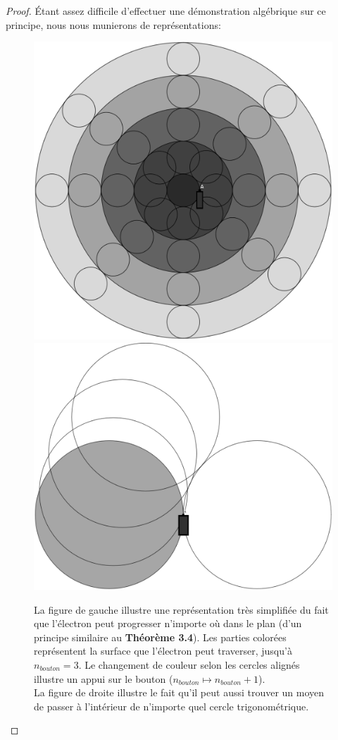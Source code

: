 \documentclass[a4paper]{amsart}
\theoremstyle{definition}
\theoremstyle{remark}
\numberwithin{equation}{section}
\begin{document}
\begin{proof}

  Étant assez difficile d'effectuer une démonstration algébrique sur ce principe, nous nous munierons de représentations:

  \begin{figure}[H]
    \centering
    \includegraphics[scale=0.13]{images/it_can.png}
    \includegraphics[scale=0.12]{images/it_can2.png}
    \caption{La figure de gauche illustre une représentation très simplifiée du fait que l'électron peut progresser n'importe où dans le plan (d'un principe similaire au \textbf{Théorème 3.4}). Les parties colorées représentent la surface que l'électron peut traverser, jusqu'à $n_{bouton}=3$. Le changement de couleur selon les cercles alignés
    illustre un appui sur le bouton ($n_{bouton} \longmapsto n_{bouton}+1$). \\ La figure de droite illustre le fait qu'il peut aussi trouver un moyen de passer à l'intérieur de n'importe quel cercle trigonométrique.}
  \end{figure}


\end{proof}
\end{document}
